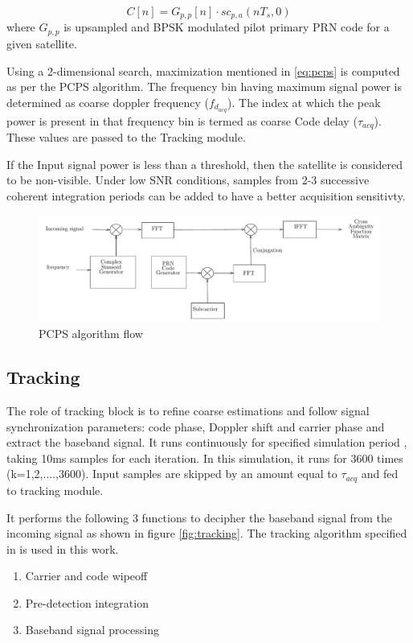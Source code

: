 \documentclass[conference]{IEEEtran}
\begin{document}
\begin{equation}
 C[n] = G_{p,p}[n] \cdot sc_{p,a}(nT_s, 0)
 \label{eq:pcps3}
\end{equation}
\noindent where $G_{p,p}$ is upsampled and BPSK modulated pilot primary PRN code for a given satellite.

Using a 2-dimensional search, maximization mentioned in \ref{eq:pcps} is computed as per the PCPS algorithm.
The frequency bin having maximum signal power is determined as coarse doppler frequency ($f_{d_{acq}}$). The index at which the peak power is present in that frequency bin is termed as coarse Code delay 
($\tau_{acq}$). These values are passed to the Tracking module. 

If the Input signal power is less than a threshold, then the satellite is 
considered to be non-visible. Under low SNR conditions, samples from 2-3 successive coherent 
integration periods can be added to have a better acquisition sensitivty.

\begin{normalsize}
\begin{figure}[ht]
	\centering
	\includegraphics[width=1\columnwidth]{figs/pcps}
	\centering
	\caption{PCPS algorithm flow}
	\label{fig:pcps_flow}
\end{figure}
\end{normalsize}

\subsection{Tracking}
The role of tracking block \cite{b5} is to refine coarse estimations and follow signal synchronization parameters: code phase, Doppler shift 
and carrier phase and extract the baseband signal. It runs continuously for specified simulation period , taking 10ms samples for each iteration. 
In this simulation, it runs for 3600 times (k=1,2,....,3600). Input samples are skipped by an amount equal to $\tau_{acq}$ and fed to tracking module.

It performs the following 3 functions to decipher 
the baseband signal from the incoming signal as shown in figure \ref{fig:tracking}. The tracking algorithm 
specified in \cite{b1} is used in this work.
\begin{enumerate}
	\item Carrier and code wipeoff 
	\item Pre-detection integration
	\item Baseband signal processing
\end{enumerate}
\end{document}
